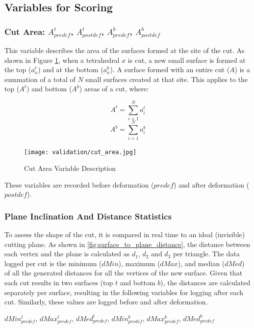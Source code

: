 \subsection{Variables for Scoring}

\subsubsection{Cut Area: $A^t_{predef}$, $A^t_{postdef}$, $A^b_{predef}$, $A^b_{postdef}$}
\label{para:data_cut_area}

This variable describes the area of the surfaces formed at the site of the cut. As shown in Figure \ref{fig:cut_area}, when a tetrahedral $x$ is cut, a new small surface is formed at the top ($a^t_x$) and at the bottom ($a^b_x$). A surface formed with an entire cut ($A$) is a summation of a total of $N$ small surfaces created at that site. This applies to the top ($A^t$) and bottom ($A^b$) areas of a cut, where:

\[ A^t = \sum_{i=1}^{N}a^t_i \]
\[ A^b = \sum_{i=1}^{N}a^b_i \]

\begin{figure}
  \centering%
  \texttt{[image: validation/cut\_area.jpg]}
  \caption{Cut Area Variable Description}\label{fig:cut_area}
\end{figure}

These variables are recorded before deformation ($predef$) and after deformation ($postdef$).

\subsubsection{Plane Inclination And Distance Statistics}\label{para:data_plane_inclination_and_distance}

To assess the shape of the cut, it is compared in real time to an ideal (invisible) cutting plane. As shown in \autoref{fig:surface_to_plane_distance}, the distance between each vertex and the plane is calculated as $d_1$, $d_2$ and $d_3$ per triangle. The data logged per cut is the minimum ($dMin$), maximum ($dMax$), and median ($dMed$) of all the generated distances for all the vertices of the new surface. Given that each cut results in two surfaces (top $t$ and bottom $b$), the distances are calculated separately per surface, resulting in the following variables for logging after each cut. Similarly, these values are logged before and after deformation.

\hfill

$dMin_{predef}^t$, $dMax_{predef}^t$, $dMed_{predef}^t$, $dMin_{predef}^b$, $dMax_{predef}^b$, $dMed_{predef}^b$

